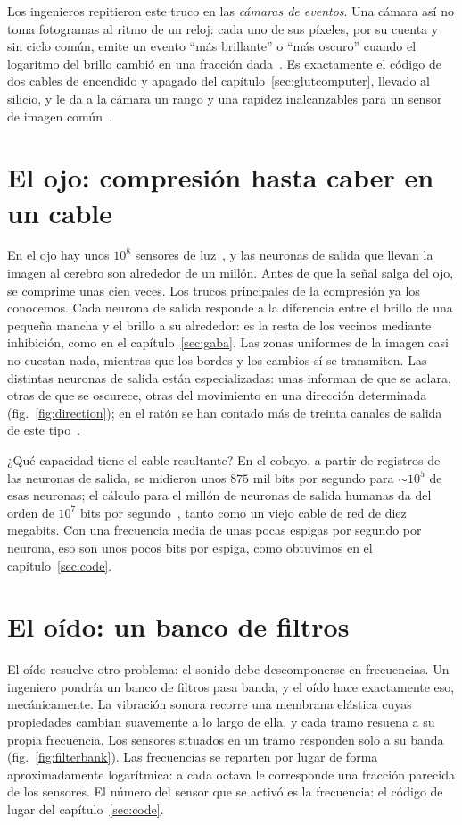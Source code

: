 Los ingenieros repitieron este truco en las \emph{cámaras de eventos}. Una cámara así no toma fotogramas al ritmo de un reloj: cada uno de sus píxeles, por su cuenta y sin ciclo común, emite un evento “más brillante” o “más oscuro” cuando el logaritmo del brillo cambió en una fracción dada~\cite{Lichtsteiner2008}. Es exactamente el código de dos cables de encendido y apagado del capítulo~\ref{sec:glutcomputer}, llevado al silicio, y le da a la cámara un rango y una rapidez inalcanzables para un sensor de imagen común~\cite{Gallego2022}.

\section{El ojo: compresión hasta caber en un cable}

En el ojo hay unos $10^8$ sensores de luz~\cite{Curcio1990}, y las neuronas de salida que llevan la imagen al cerebro son alrededor de un millón. Antes de que la señal salga del ojo, se comprime unas cien veces. Los trucos principales de la compresión ya los conocemos. Cada neurona de salida responde a la diferencia entre el brillo de una pequeña mancha y el brillo a su alrededor: es la resta de los vecinos mediante inhibición, como en el capítulo~\ref{sec:gaba}. Las zonas uniformes de la imagen casi no cuestan nada, mientras que los bordes y los cambios sí se transmiten. Las distintas neuronas de salida están especializadas: unas informan de que se aclara, otras de que se oscurece, otras del movimiento en una dirección determinada (fig.~\ref{fig:direction}); en el ratón se han contado más de treinta canales de salida de este tipo~\cite{Baden2016}.

¿Qué capacidad tiene el cable resultante? En el cobayo, a partir de registros de las neuronas de salida, se midieron unos $875$ mil bits por segundo para $\sim10^5$ de esas neuronas; el cálculo para el millón de neuronas de salida humanas da del orden de $10^7$ bits por segundo~\cite{Koch2006}, tanto como un viejo cable de red de diez megabits. Con una frecuencia media de unas pocas espigas por segundo por neurona, eso son unos pocos bits por espiga, como obtuvimos en el capítulo~\ref{sec:code}.

\section{El oído: un banco de filtros}

El oído resuelve otro problema: el sonido debe descomponerse en frecuencias. Un ingeniero pondría un banco de filtros pasa banda, y el oído hace exactamente eso, mecánicamente. La vibración sonora recorre una membrana elástica cuyas propiedades cambian suavemente a lo largo de ella, y cada tramo resuena a su propia frecuencia. Los sensores situados en un tramo responden solo a su banda (fig.~\ref{fig:filterbank}). Las frecuencias se reparten por lugar de forma aproximadamente logarítmica: a cada octava le corresponde una fracción parecida de los sensores. El número del sensor que se activó es la frecuencia: el código de lugar del capítulo~\ref{sec:code}.


